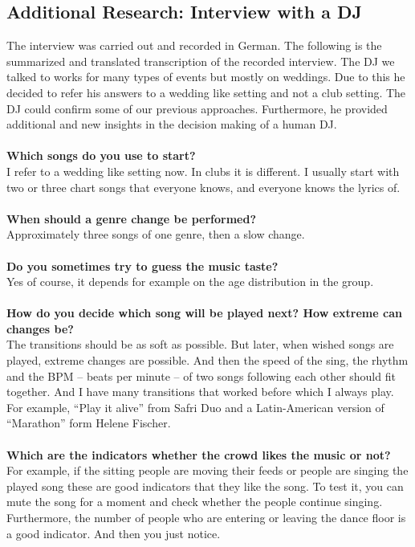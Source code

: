 \documentclass{article}
\begin{document}
\subsection{Additional Research: Interview with a DJ}
The interview was carried out and recorded in German. The following is the summarized and translated transcription of the recorded interview. The DJ we talked to works for many types of events but mostly on weddings. Due to this he decided to refer his answers to a wedding like setting and not a club setting. The DJ could confirm some of our previous approaches. Furthermore, he provided additional and new insights in the decision making of a human DJ. \\
\\
\textbf{Which songs do you use to start?}\\
I refer to a wedding like setting now. In clubs it is different. I usually start with two or three chart songs that everyone knows, and everyone knows the lyrics of. \\
\\
\textbf{When should a genre change be performed?}\\
Approximately three songs of one genre, then a slow change.\\
\\
\textbf{Do you sometimes try to guess the music taste?}\\
Yes of course, it depends for example on the age distribution in the group. \\
\\
\textbf{How do you decide which song will be played next? How extreme can changes be?} \\
The transitions should be as soft as possible. But later, when wished songs are played, extreme changes are possible. And then the speed of the sing, the rhythm and the BPM – beats per minute – of two songs following each other should fit together. And I have many transitions that worked before which I always play. For example, “Play it alive” from Safri Duo and a Latin-American version of “Marathon” form Helene Fischer. \\
\\
\textbf{Which are the indicators whether the crowd likes the music or not?} \\
For example, if the sitting people are moving their feeds or people are singing the played song these are good indicators that they like the song. To test it, you can mute the song for a moment and check whether the people continue singing. Furthermore, the number of people who are entering or leaving the dance floor is a good indicator. And then you just notice. \\
\end{document}
